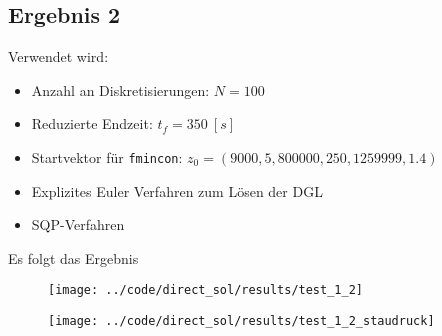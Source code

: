 \subsection{Ergebnis 2}\label{kap:Versuch12}
Verwendet wird:
\begin{itemize}
\item Anzahl an Diskretisierungen: $N = 100$ 
\item Reduzierte Endzeit: $t_f = 350 \ [s]$
\item Startvektor für \texttt{fmincon}: $z_0 = (9000,5,800000,250,1259999,1.4)$
\item Explizites Euler Verfahren zum Lösen der DGL
%
\item SQP-Verfahren
\end{itemize}
Es folgt das Ergebnis
\begin{figure}[H]
\begin{center}
\texttt{[image: ../code/direct\_sol/results/test\_1\_2]}
 \label{img:test_1_2}
\end{center}
\end{figure}

\begin{figure}[H]
\begin{center}
\texttt{[image: ../code/direct\_sol/results/test\_1\_2\_staudruck]}
\label{img:test_1_2_staudruck}
\end{center}
\end{figure}




